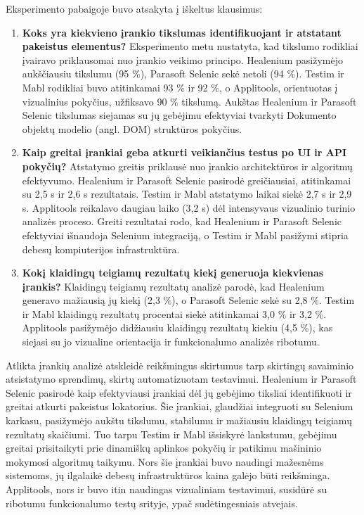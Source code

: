 \documentclass[
]{VUMIFPSkursinis}
\begin{document}
Eksperimento pabaigoje buvo atsakyta į iškeltus klausimus:
\begin{enumerate}
    \item \textbf{Koks yra kiekvieno įrankio tikslumas identifikuojant ir atstatant pakeistus elementus?} Eksperimento metu nustatyta, kad tikslumo rodikliai įvairavo priklausomai nuo įrankio veikimo principo. Healenium pasižymėjo aukščiausiu tikslumu (95 \%), Parasoft Selenic sekė netoli (94 \%). Testim ir Mabl rodikliai buvo atitinkamai 93 \% ir 92 \%, o Applitools, orientuotas į vizualinius pokyčius, užfiksavo 90 \% tikslumą. Aukštas Healenium ir Parasoft Selenic tikslumas siejamas su jų gebėjimu efektyviai tvarkyti Dokumento objektų modelio (angl. DOM) struktūros pokyčius.
    \item \textbf{Kaip greitai įrankiai geba atkurti veikiančius testus po UI ir API pokyčių?} Atstatymo greitis priklausė nuo įrankio architektūros ir algoritmų efektyvumo. Healenium ir Parasoft Selenic pasirodė greičiausiai, atitinkamai su 2,5 s ir 2,6 s rezultatais. Testim ir Mabl atstatymo laikai siekė 2,7 s ir 2,9 s. Applitools reikalavo daugiau laiko (3,2 s) dėl intensyvaus vizualinio turinio analizės proceso. Greiti rezultatai rodo, kad Healenium ir Parasoft Selenic efektyviai išnaudoja Selenium integraciją, o Testim ir Mabl pasižymi stipria debesų kompiuterijos infrastruktūra.
    \item \textbf{Kokį klaidingų teigiamų rezultatų kiekį generuoja kiekvienas įrankis?}  Klaidingų teigiamų rezultatų analizė parodė, kad Healenium generavo mažiausią jų kiekį (2,3 \%), o Parasoft Selenic sekė su 2,8 \%. Testim ir Mabl klaidingų rezultatų procentai siekė atitinkamai 3,0 \% ir 3,2 \%. Applitools pasižymėjo didžiausiu klaidingų rezultatų kiekiu (4,5 \%), kas siejasi su jo vizualine orientacija ir funkcionalumo analizės ribotumu.
\end{enumerate}


Atlikta įrankių analizė atskleidė reikšmingus skirtumus tarp skirtingų savaiminio atsistatymo sprendimų, skirtų automatizuotam testavimui. Healenium ir Parasoft Selenic pasirodė kaip efektyviausi įrankiai dėl jų gebėjimo tiksliai identifikuoti ir greitai atkurti pakeistus lokatorius. Šie įrankiai, glaudžiai integruoti su Selenium karkasu, pasižymėjo aukštu tikslumu, stabilumu ir mažiausiu klaidingų teigiamų rezultatų skaičiumi. Tuo tarpu Testim ir Mabl išsiskyrė lankstumu, gebėjimu greitai prisitaikyti prie dinamiškų aplinkos pokyčių ir patikimu mašininio mokymosi algoritmų taikymu. Nors šie įrankiai buvo naudingi mažesnėms sistemoms, jų ilgalaikė debesų infrastruktūros kaina galėjo būti reikšminga. Applitools, nors ir buvo itin naudingas vizualiniam testavimui, susidūrė su ribotumu funkcionalumo testų srityje, ypač sudėtingesniais atvejais.
\end{document}
